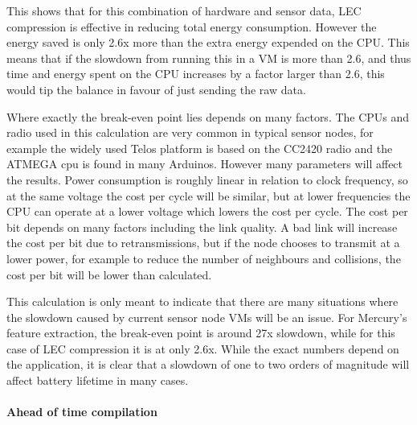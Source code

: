 This shows that for this combination of hardware and sensor data, LEC compression is effective in reducing total energy consumption. However the energy saved is only 2.6x more than the extra energy expended on the CPU. This means that if the slowdown from running this in a VM is more than 2.6, and thus time and energy spent on the CPU increases by a factor larger than 2.6, this would tip the balance in favour of just sending the raw data.

Where exactly the break-even point lies depends on many factors. The CPUs and radio used in this calculation are very common in typical sensor nodes, for example the widely used Telos platform \cite{Polastre:2005ut} is based on the CC2420 radio and the ATMEGA cpu is found in many Arduinos. However many parameters will affect the results. Power consumption is roughly linear in relation to clock frequency, so at the same voltage the cost per cycle will be similar, but at lower frequencies the CPU can operate at a lower voltage which lowers the cost per cycle. The cost per bit depends on many factors including the link quality. A bad link will increase the cost per bit due to retransmissions, but if the node chooses to transmit at a lower power, for example to reduce the number of neighbours and collisions, the cost per bit will be lower than calculated.

This calculation is only meant to indicate that there are many situations where the slowdown caused by current sensor node VMs will be an issue. For Mercury's feature extraction, the break-even point is around 27x slowdown, while for this case of LEC compression it is at only 2.6x. While the exact numbers depend on the application, it is clear that a slowdown of one to two orders of magnitude will affect battery lifetime in many cases.

\paragraph{Ahead of time compilation}

